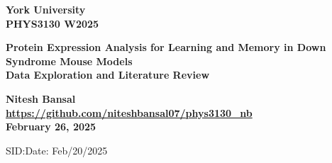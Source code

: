 \documentclass[a4paper,12pt]{article}
\begin{document}
\begin{minipage}[b]{110mm}
        {\Huge\bf York University \\PHYS3130 W2025
        \vspace*{17mm}}
\end{minipage}

\par\noindent                                           %
\vspace*{2cm}
\begin{center}
        \Large\bf Protein Expression Analysis for Learning and Memory in Down Syndrome Mouse Models\\ %
        \Large\bf Data Exploration and Literature Review
\end{center}
\vspace*{1.5cm}
\begin{center}
        \bf Nitesh Bansal\\                 %
        \url{https://github.com/niteshbansal07/phys3130_nb} \\ %
        February 26, 2025                       %
\end{center}
\vspace*{5mm}
%
%                       
\begin{abstract}
        The study examines the protein expression in the cerebral cortex of mice with Down Syndrome. The CSV contains 1080 sample data across eight different experiment groups, which include control(c-CS) and trisomic(t-CS) mice \cite{higuera2015mice}. The mice were either given cognitive training and drug treatment or not, depending on the control group. Many methods like statistical analysis, missing data handling, correlation studies, and data classification were employed to identify key proteins distinguishing learning outcomes. Findings contribute to both neuroscience and data science, showcasing the role of machine learning in biomarker discovery and cognitive disorder research.
\end{abstract}

\vspace*{1cm}

\vspace*{3cm}
SID:\hspace*{8cm}Date: Feb/20/2025


\newpage
\setcounter{page}{1}                            %
%
\tableofcontents                                %
\end{document}

